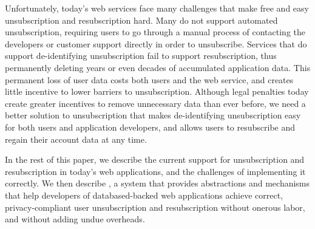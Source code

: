 Unfortunately, today's web services face many challenges that make free and easy unsubscription and
resubscription hard. Many do not support automated unsubscription, requiring users to go through a
manual process of contacting the developers or customer support directly in order to unsubscribe.
Services that do support de-identifying unsubscription fail to support resubscription, thus 
permanently deleting years or even decades of accumulated application data. This permanent loss of user data
costs both users and the web service, and creates little incentive to lower barriers to
unsubscription.
Although legal penalties today create greater incentives to remove unnecessary data than ever
before, we need a better solution to unsubscription that makes de-identifying unsubscription easy
for both users and application developers, and allows users to resubscribe and regain their account
data at any time.

%

In the rest of this paper, we describe the current support for unsubscription and resubscription in
today's web applications, and the challenges of implementing it correctly.  We then describe \sys, a
system that provides abstractions and mechanisms that help developers of databased-backed web
applications achieve correct, privacy-compliant user unsubscription and resubscription without
onerous labor, and without adding undue overheads.
